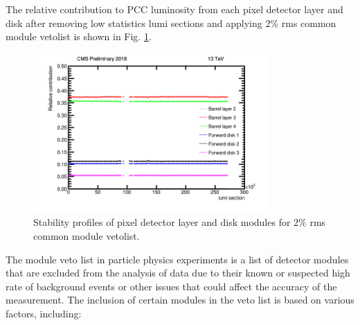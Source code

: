 The relative contribution to PCC luminosity from each pixel detector layer and disk after removing low statistics lumi sections and applying 2\% rms common module vetolist is shown in Fig. \ref{fig:stabprof}.


\begin{figure}[!htp]
\centering
\includegraphics[width=0.8\textwidth]{ashish_thesis/ProfileX_combined_testing_LUM_20-001.png}
\caption{%
   Stability profiles of pixel detector layer and disk modules for 2\% rms common module vetolist.
}
\label{fig:stabprof}
\end{figure}


The module veto list in particle physics experiments is a list of detector modules that are excluded from the analysis of data due to their known or suspected high rate of background events or other issues that could affect the accuracy of the measurement. The inclusion of certain modules in the veto list is based on various factors, including:

